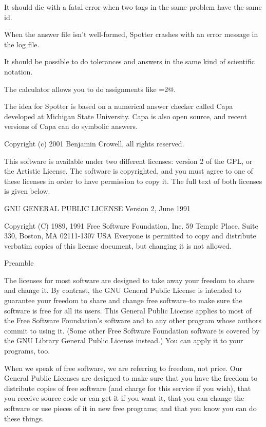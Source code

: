 \documentclass{doc}
\begin{document}
It should die with a fatal error when two \verb@find@ tags in the same problem have
the same id.

When the answer file isn't well-formed, Spotter crashes with an error message in
the log file.

It should be possible to do tolerances and answers in the same kind of
scientific notation.


The calculator allows you to do assignments like =2@.

\label{acknowledgements}
The idea for Spotter is based on a numerical answer checker called Capa developed
at Michigan State University. Capa is also open source, and recent versions of
Capa can do symbolic answers.

\label{license}
Copyright (c) 2001 Benjamin Crowell, all rights reserved.

This software is available under two different licenses: 
  version 2 of the GPL, or
  the Artistic License. 
The software is copyrighted, and you must agree to one of
these licenses in order to have permission to copy it. The full
text of both licenses is given below.

		    GNU GENERAL PUBLIC LICENSE
		       Version 2, June 1991

 Copyright (C) 1989, 1991 Free Software Foundation, Inc.
                       59 Temple Place, Suite 330, Boston, MA  02111-1307  USA
 Everyone is permitted to copy and distribute verbatim copies
 of this license document, but changing it is not allowed.

			    Preamble

  The licenses for most software are designed to take away your
freedom to share and change it.  By contrast, the GNU General Public
License is intended to guarantee your freedom to share and change free
software--to make sure the software is free for all its users.  This
General Public License applies to most of the Free Software
Foundation's software and to any other program whose authors commit to
using it.  (Some other Free Software Foundation software is covered by
the GNU Library General Public License instead.)  You can apply it to
your programs, too.

  When we speak of free software, we are referring to freedom, not
price.  Our General Public Licenses are designed to make sure that you
have the freedom to distribute copies of free software (and charge for
this service if you wish), that you receive source code or can get it
if you want it, that you can change the software or use pieces of it
in new free programs; and that you know you can do these things.
\end{document}
